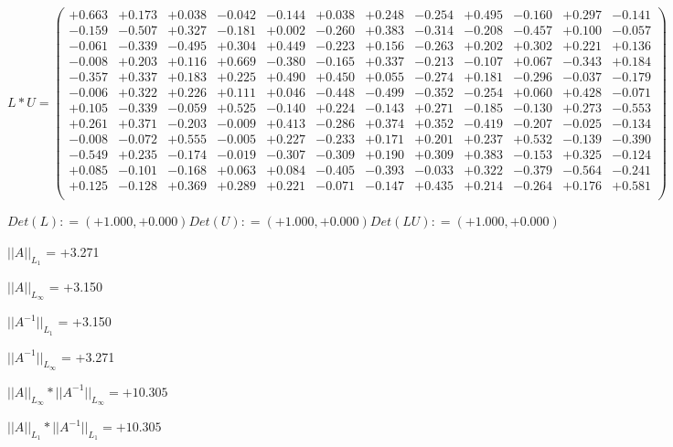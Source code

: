 \documentclass[9pt]{article}
\theoremstyle{plain}
\theoremstyle{definition}
\theoremstyle{remark}
\numberwithin{equation}{section}
\begin{document}
$L * U  = \left(
\begin{array}{
cccccccccccc}
+0.663 & +0.173 & +0.038 & -0.042 & -0.144 & +0.038 & +0.248 & -0.254 & +0.495 & -0.160 & +0.297 & -0.141 \\
-0.159 & -0.507 & +0.327 & -0.181 & +0.002 & -0.260 & +0.383 & -0.314 & -0.208 & -0.457 & +0.100 & -0.057 \\
-0.061 & -0.339 & -0.495 & +0.304 & +0.449 & -0.223 & +0.156 & -0.263 & +0.202 & +0.302 & +0.221 & +0.136 \\
-0.008 & +0.203 & +0.116 & +0.669 & -0.380 & -0.165 & +0.337 & -0.213 & -0.107 & +0.067 & -0.343 & +0.184 \\
-0.357 & +0.337 & +0.183 & +0.225 & +0.490 & +0.450 & +0.055 & -0.274 & +0.181 & -0.296 & -0.037 & -0.179 \\
-0.006 & +0.322 & +0.226 & +0.111 & +0.046 & -0.448 & -0.499 & -0.352 & -0.254 & +0.060 & +0.428 & -0.071 \\
+0.105 & -0.339 & -0.059 & +0.525 & -0.140 & +0.224 & -0.143 & +0.271 & -0.185 & -0.130 & +0.273 & -0.553 \\
+0.261 & +0.371 & -0.203 & -0.009 & +0.413 & -0.286 & +0.374 & +0.352 & -0.419 & -0.207 & -0.025 & -0.134 \\
-0.008 & -0.072 & +0.555 & -0.005 & +0.227 & -0.233 & +0.171 & +0.201 & +0.237 & +0.532 & -0.139 & -0.390 \\
-0.549 & +0.235 & -0.174 & -0.019 & -0.307 & -0.309 & +0.190 & +0.309 & +0.383 & -0.153 & +0.325 & -0.124 \\
+0.085 & -0.101 & -0.168 & +0.063 & +0.084 & -0.405 & -0.393 & -0.033 & +0.322 & -0.379 & -0.564 & -0.241 \\
+0.125 & -0.128 & +0.369 & +0.289 & +0.221 & -0.071 & -0.147 & +0.435 & +0.214 & -0.264 & +0.176 & +0.581 \\
\end{array}
\right)$ \newline 

$Det(L) :    = (+1.000,+0.000)     Det(U) :    = (+1.000,+0.000)     Det(LU) :    = (+1.000,+0.000)$

$||A||_{L_1}$  = +3.271

$||A||_{L_{\infty}}$ = +3.150

$||A^{-1}||_{L_1}$  = +3.150

$||A^{-1}||_{L_{\infty}}$ = +3.271

$||A||_{L_{\infty}} * ||A^{-1}||_{L_{\infty}} = +10.305$

$||A||_{L_1} * ||A^{-1}||_{L_1} = +10.305$
\end{document}
